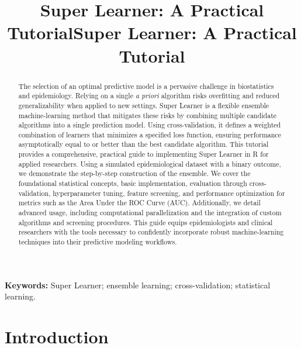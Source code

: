 \documentclass[12pt]{article}
\title{\textbf{Super Learner: A Practical Tutorial}}
\author{}
\date{}
\title{\textbf{Super Learner: A Practical Tutorial}}
\author{}
\date{}
\begin{document}
\maketitle

\begin{abstract}
The selection of an optimal predictive model is a pervasive challenge in biostatistics and epidemiology. Relying on a single \textit{a priori} algorithm risks overfitting and reduced generalizability when applied to new settings. Super Learner is a flexible ensemble machine-learning method that mitigates these risks by combining multiple candidate algorithms into a single prediction model. Using cross-validation, it defines a weighted combination of learners that minimizes a specified loss function, ensuring performance asymptotically equal to or better than the best candidate algorithm. This tutorial provides a comprehensive, practical guide to implementing Super Learner in R for applied researchers. Using a simulated epidemiological dataset with a binary outcome, we demonstrate the step-by-step construction of the ensemble. We cover the foundational statistical concepts, basic implementation, evaluation through cross-validation, hyperparameter tuning, feature screening, and performance optimization for metrics such as the Area Under the ROC Curve (AUC). Additionally, we detail advanced usage, including computational parallelization and the integration of custom algorithms and screening procedures. This guide equips epidemiologists and clinical researchers with the tools necessary to confidently incorporate robust machine-learning techniques into their predictive modeling workflows.
\end{abstract}

\noindent\textbf{Keywords:} Super Learner; ensemble learning; cross-validation; statistical learning.

\section{Introduction}
\end{document}
